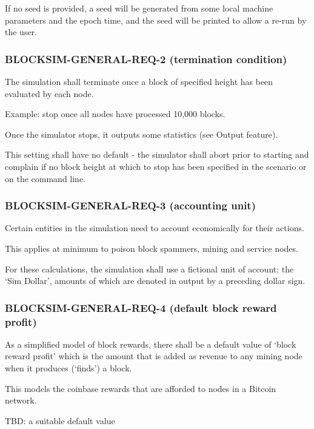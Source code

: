 \documentclass{scrreprt}
\begin{document}
        If no seed is provided, a seed will be generated from some local
        machine parameters and the epoch time, and the seed will be printed
        to allow a re-run by the user.

      \subsubsection{BLOCKSIM-GENERAL-REQ-2 (termination condition)}

        The simulation shall terminate once a block of specified height has
        been evaluated by each node.

        Example: stop once all nodes have processed 10,000 blocks.

        Once the simulator stops, it outputs some statistics (see Output
        feature).

        This setting shall have no default - the simulator shall abort prior
        to starting and complain if no block height at which to stop has been
        specified in the scenario or on the command line.

      \subsubsection{BLOCKSIM-GENERAL-REQ-3 (accounting unit)}

        Certain entities in the simulation need to account economically for
        their actions.

        This applies at minimum to poison block spammers, mining and service
        nodes.

        For these calculations, the simulation shall use a fictional unit of
        account: the `Sim Dollar', amounts of which are denoted in output
        by a preceding dollar sign.

      \subsubsection{BLOCKSIM-GENERAL-REQ-4 (default block reward profit)}

        As a simplified model of block rewards, there shall be a default
        value of `block reward profit' which is the amount that is added
        as revenue to any mining node when it produces (`finds') a block.

        This models the coinbase rewards that are afforded to nodes in
        a Bitcoin network.

        TBD: a suitable default value
\end{document}

